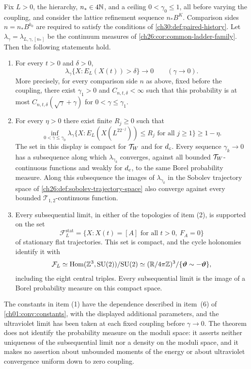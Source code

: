\begin{theorem}\label{ch30:thm:flat-supported-cluster-laws}
Fix $L>0$, the hierarchy, $n_*\in4\mathbb N$, and a ceiling $0<\gamma_0\le1$, all before varying the coupling, and consider the lattice refinement sequence $n_*B^K$. Comparison sides $n=n_*B^{k_0}$ are required to satisfy the conditions of \cref{ch30:def:paired-history}. Let $\lambda_\gamma=\lambda_{L,\gamma,[n_*]}$ be the continuum measures of \cref{ch26:cor:common-ladder-family}. Then the following statements hold.
\begin{enumerate}
\item For every $t>0$ and $\delta>0$,
\begin{equation}\label{ch30:eq:small-coupling-energy-tail}
 \lambda_\gamma\{X:E_L(X(t))>\delta\}\longrightarrow0\qquad(\gamma\to0).
\end{equation}
More precisely, for every comparison side $n$ as above, fixed before the coupling, there exist $\gamma_1>0$ and $C_{n,t,\delta}<\infty$ such that this probability is at most $C_{n,t,\delta}(\sqrt\gamma+\gamma)$ for $0<\gamma\le\gamma_1$.
\item For every $\eta>0$ there exist finite $R_j\ge0$ such that
\[
 \inf_{0<\gamma\le\gamma_0}\lambda_\gamma\bigl\{X:E_L(X(L^22^{-j}))\le R_j\text{ for all }j\ge1\bigr\}\ge1-\eta .
\]
The set in this display is compact for $\mathcal T_W$ and for $d_c$. Every sequence $\gamma_k\to0$ has a subsequence along which $\lambda_{\gamma_k}$ converges, against all bounded $\mathcal T_W$-continuous functions and weakly for $d_c$, to the same Borel probability measure. Along this subsequence the images of $\lambda_{\gamma_k}$ in the Sobolev trajectory space of \cref{ch26:def:sobolev-trajectory-space} also converge against every bounded $\mathcal T_{1,2}$-continuous function.
\item Every subsequential limit, in either of the topologies of item (2), is supported on the set
\[
 \mathcal F_L^{\mathrm{stat}}=\bigl\{X:X(t)=[A]\text{ for all }t>0,\ F_A=0\bigr\}
\]
of stationary flat trajectories. This set is compact, and the cycle holonomies identify it with
\[
 \mathcal F_L\simeq\operatorname{Hom}(\mathbb Z^3,\mathrm{SU}(2))/\mathrm{SU}(2)\simeq(\mathbb R/4\pi\mathbb Z)^3/\{\bm\vartheta\sim-\bm\vartheta\},
\]
including the eight central triples. Every subsequential limit is the image of a Borel probability measure on this compact space.
\end{enumerate}
\end{theorem}

The constants in item (1) have the dependence described in item~(6) of \cref{ch01:conv:constants}, with the displayed additional parameters, and the ultraviolet limit has been taken at each fixed coupling before $\gamma\to0$. The theorem does not identify the probability measure on the moduli space: it asserts neither uniqueness of the subsequential limit nor a density on the moduli space, and it makes no assertion about unbounded moments of the energy or about ultraviolet convergence uniform down to zero coupling.

